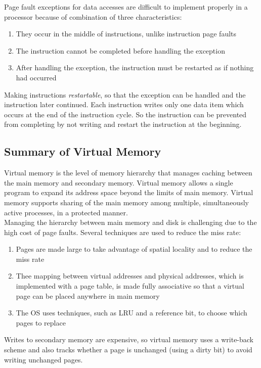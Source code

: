 \documentclass[12pt]{article}
\theoremstyle{definition}
\begin{document}
  Page fault exceptions for data accesses are difficult to implement properly in a processor because of combination of three characteristics:
  \begin{enumerate}
    \item They occur in the middle of instructions, unlike instruction page faults
    \item The instruction cannot be completed before handling the exception
    \item After handling the exception, the instruction must be restarted as if nothing had occurred
  \end{enumerate}
  Making instructions \emph{restartable}, so that the exception can be handled and the instruction later continued.
  Each instruction writes only one data item which occurs at the end of the instruction cycle.
  So the instruction can be prevented from completing by not writing and restart the instruction at the beginning.

  \subsection{Summary of Virtual Memory}
  Virtual memory is the level of memory hierarchy that manages caching between the main memory and secondary memory.
  Virtual memory allows a single program to expand its address space beyond the limits of main memory.
  Virtual memory supports sharing of the main memory among multiple, simultaneously active processes, in a protected manner. \\

  Managing the hierarchy between main memory and disk is challenging due to the high cost of page faults.
  Several techniques are used to reduce the miss rate:
  \begin{enumerate}
    \item Pages are made large to take advantage of spatial locality and to reduce the miss rate
    \item Thee mapping between virtual addresses and physical addresses, which is implemented with a page table, is made fully associative so that a virtual page can be placed anywhere in main memory
    \item The OS uses techniques, such as LRU and a reference bit, to choose which pages to replace
  \end{enumerate}
  Writes to secondary memory are expensive, so virtual memory uses a write-back scheme and also tracks whether a page is unchanged (using a dirty bit) to avoid writing unchanged pages. \\
\end{document}
